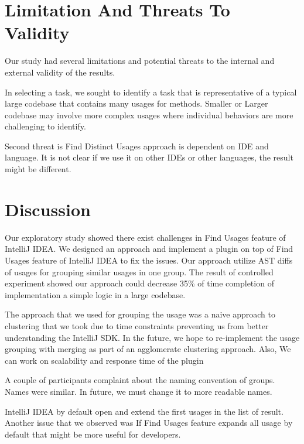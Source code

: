 \documentclass[conference]{IEEEtran}
\begin{document}
\section{Limitation And Threats To Validity}
Our study had several limitations and potential threats to the internal and external validity of the results. \par  

In selecting a task, we sought to identify a task that is representative of a typical large codebase that contains many usages for methods. Smaller or Larger codebase may involve more complex usages where individual behaviors are more challenging to identify. \par 

Second threat is Find Distinct Usages approach is dependent on IDE and language. It is not clear if we use it on other IDEs or other languages, the result might be different.\par 

\section{Discussion}
Our exploratory study showed there exist challenges in Find Usages feature of IntelliJ IDEA. We designed an approach and implement a plugin on top of Find Usages feature of IntelliJ IDEA to fix the issues. Our approach utilize AST diffs of usages for grouping similar usages in one group. The result of controlled experiment showed our approach could decrease 35\% of time completion of implementation a simple logic in a large codebase.

The approach that we used for grouping the usage was a naive approach to clustering that we took due to time constraints preventing us from better understanding the IntelliJ SDK. In the future, we hope to re-implement the usage grouping with merging as part of an agglomerate clustering approach. Also, We can work on scalability and response time of the plugin \par

A couple of participants complaint about the naming convention of groups. Names were similar. In future, we must change it to more readable names.\par

IntelliJ IDEA by default open and extend the first usages in the list of result. Another issue that we observed was If Find Usages feature expands all usage by default that might be more useful for developers.\par
\end{document}
